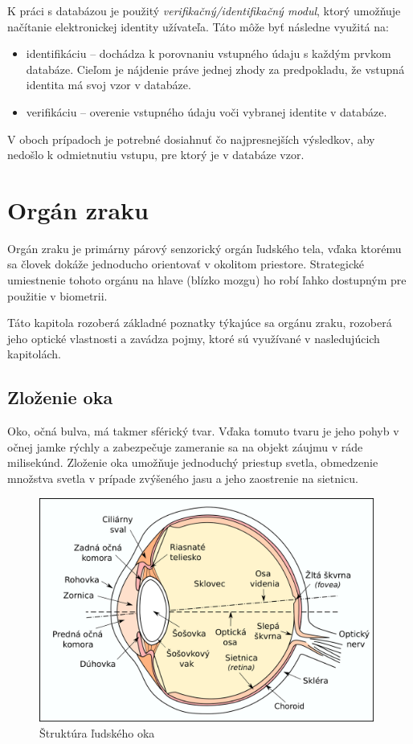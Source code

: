 K práci s databázou je použitý \emph{verifikačný/identifikačný modul}, ktorý umožňuje načítanie elektronickej identity užívateľa. Táto môže byť následne využitá na:
\begin{itemize}
\item identifikáciu -- dochádza k porovnaniu vstupného údaju s každým prvkom databáze. Cieľom je nájdenie práve jednej zhody za predpokladu, že vstupná identita má svoj vzor v databáze.
\item verifikáciu -- overenie vstupného údaju voči vybranej identite v databáze.
\end{itemize}

V oboch prípadoch je potrebné dosiahnuť čo najpresnejších výsledkov, aby nedošlo k odmietnutiu vstupu, pre ktorý je v databáze vzor.



\chapter{Orgán zraku}\label{ch:kap1}
Orgán zraku je primárny párový senzorický orgán ľudského tela, vďaka ktorému sa človek dokáže jednoducho orientovať v okolitom priestore. Strategické umiestnenie tohoto orgánu na hlave (blízko mozgu) ho robí ľahko dostupným pre použitie v biometrii.

Táto kapitola rozoberá základné poznatky týkajúce sa orgánu zraku, rozoberá jeho optické vlastnosti a zavádza pojmy, ktoré sú využívané v nasledujúcich kapitolách.

\section{Zloženie oka}\label{sec:oko}
Oko, očná bulva, má takmer sférický tvar. Vďaka tomuto tvaru je jeho pohyb v očnej jamke rýchly a zabezpečuje zameranie sa na objekt záujmu v ráde milisekúnd\cite{}.
Zloženie oka umožňuje jednoduchý priestup svetla, obmedzenie množstva svetla v prípade zvýšeného jasu a jeho zaostrenie na sietnicu.

\begin{figure}[h]
  \centering
  \includegraphics[width=11cm]{img/Eyesection.png}
  \caption{Štruktúra ľudského oka\cite{retina}}
\end{figure}

